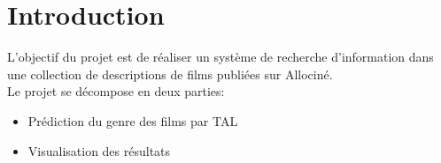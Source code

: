 \section*{Introduction}
L'objectif du projet est de réaliser un système de recherche d’information dans une collection de descriptions de films publiées sur Allociné.\\
Le projet se décompose en deux parties:
\begin{itemize}
\item  Prédiction du genre des films par TAL
\item Visualisation des résultats
\end{itemize}